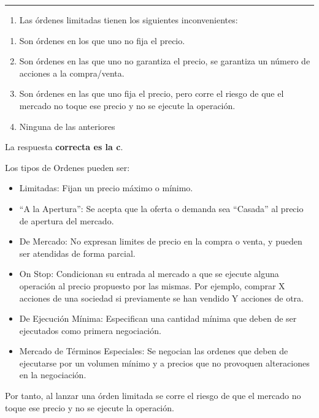 \documentclass[
  letterpaper,
  DIV=11,
  numbers=noendperiod]{scrreprt}
\providecommand{\tightlist}{%
  \setlength{\itemsep}{0pt}\setlength{\parskip}{0pt}}\usepackage{longtable,booktabs,array}
\begin{document}
\begin{center}\rule{0.5\linewidth}{0.5pt}\end{center}

\begin{enumerate}
\def\labelenumi{\arabic{enumi}.}
\setcounter{enumi}{6}
\tightlist
\item
  Las órdenes limitadas tienen los siguientes inconvenientes:
\end{enumerate}

\begin{enumerate}
\def\labelenumi{\alph{enumi})}
\item
  Son órdenes en los que uno no fija el precio.
\item
  Son órdenes en las que uno no garantiza el precio, se garantiza un
  número de acciones a la compra/venta.
\item
  Son órdenes en las que uno fija el precio, pero corre el riesgo de que
  el mercado no toque ese precio y no se ejecute la operación.
\item
  Ninguna de las anteriores
\end{enumerate}

\begin{tcolorbox}[enhanced jigsaw, left=2mm, opacityback=0, colback=white, breakable, arc=.35mm, bottomrule=.15mm, rightrule=.15mm, toprule=.15mm, leftrule=.75mm, colframe=quarto-callout-tip-color-frame]
\begin{minipage}[t]{5.5mm}
\textcolor{quarto-callout-tip-color}{\faLightbulb}
\end{minipage}%
\begin{minipage}[t]{\textwidth - 5.5mm}

La respuesta \textbf{correcta es la c}.

Los tipos de Ordenes pueden ser:

\begin{itemize}
\item
  Limitadas: Fijan un precio máximo o mínimo.
\item
  ``A la Apertura'': Se acepta que la oferta o demanda sea ``Casada'' al
  precio de apertura del mercado.
\item
  De Mercado: No expresan limites de precio en la compra o venta, y
  pueden ser atendidas de forma parcial.
\item
  On Stop: Condicionan su entrada al mercado a que se ejecute alguna
  operación al precio propuesto por las mismas. Por ejemplo, comprar X
  acciones de una sociedad si previamente se han vendido Y acciones de
  otra.
\item
  De Ejecución Mínima: Especifican una cantidad mínima que deben de ser
  ejecutados como primera negociación.
\item
  Mercado de Términos Especiales: Se negocian las ordenes que deben de
  ejecutarse por un volumen mínimo y a precios que no provoquen
  alteraciones en la negociación.
\end{itemize}

Por tanto, al lanzar una órden limitada se corre el riesgo de que el
mercado no toque ese precio y no se ejecute la operación.

\end{minipage}%
\end{tcolorbox}
\end{document}
